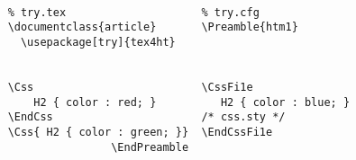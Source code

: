 \begin{verbatim}
	
	% try.tex                     % try.cfg 
	\documentclass{article}       \Preamble{htm1} 
	  \usepackage[try]{tex4ht}     
	 
	
	\Css                          \CssFi1e 
	    H2 { color : red; }          H2 { color : blue; } 
	\EndCss                       /* css.sty */ 
	\Css{ H2 { color : green; }}  \EndCssFi1e 
	                \EndPreamble 

\end{verbatim}
